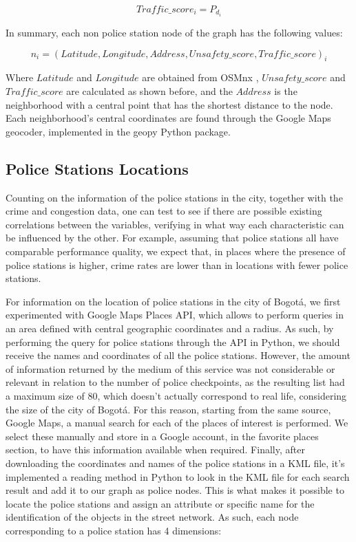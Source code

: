 \documentclass[runningheads]{llncs}
\begin{document}
$$Traffic\_score_i = P_{d_i}$$

In summary, each non police station node of the graph has the following values:

$$n_i = (Latitude, Longitude, Address, Unsafety\_score, Traffic\_score)_i$$

Where $Latitude$ and $Longitude$ are obtained from OSMnx \cite{geoff_osmnx:_2017}, $Unsafety\_score$ and $Traffic\_score$ are calculated as shown before, and the $Address$ is the neighborhood with a central point that has the shortest distance to the node. Each neighborhood's central coordinates are found through the Google Maps geocoder, implemented in the geopy \cite{noauthor_geopy_nodate} Python package.

\subsection{Police Stations Locations}

Counting on the information of the police stations in the city, together with the crime and congestion data, one can test to see if there are possible existing correlations between the variables, verifying in what way each characteristic can be influenced by the other. For example, assuming that police stations all have comparable performance quality, we expect that, in places where the presence of police stations is higher, crime rates are lower than in locations with fewer police stations.

For information on the location of police stations in the city of Bogotá, we first experimented with Google Maps Places API, which allows to perform queries in an area defined with central geographic coordinates and a radius. As such, by performing the query for police stations through the API in Python, we should receive the names and coordinates of all the police stations. However, the amount of information returned by the medium of this service was not considerable or relevant in relation to the number of police checkpoints, as the resulting list had a maximum size of 80, which doesn't actually correspond to real life, considering the size of the city of Bogotá. For this reason, starting from the same source, Google Maps, a manual search for each of the places of interest is performed. We select these manually and store in a Google account, in the favorite places section, to have this information available when required. Finally, after downloading the coordinates and names of the police stations in a KML file, it's implemented a reading method in Python to look in the KML file for each search result and add it to our graph as police nodes. This is what makes it possible to locate the police stations and assign an attribute or specific name for the identification of the objects in the street network. As such, each node corresponding to a police station has 4 dimensions:
\end{document}
